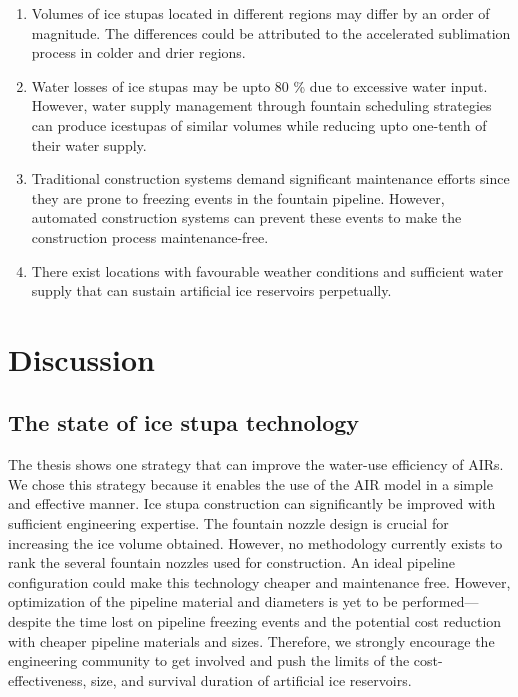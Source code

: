 \begin{enumerate} 

\item Volumes of ice stupas located in different regions may differ by an order of magnitude. The differences
  could be attributed to the accelerated sublimation process in colder and drier regions.

\item Water losses of ice stupas may be upto 80 \% due to excessive water input. However, water supply
  management through fountain scheduling strategies can produce icestupas of similar volumes while reducing upto
  one-tenth of their water supply.

\item Traditional construction systems demand significant maintenance efforts since they are prone to freezing
  events in the fountain pipeline. However, automated construction systems can prevent these events to make the
  construction process maintenance-free.

\item There exist locations with favourable weather conditions and sufficient water supply that can sustain
  artificial ice reservoirs perpetually.

\end{enumerate}

\section{Discussion}

\subsection{The state of ice stupa technology}

The thesis shows one strategy that can improve the water-use efficiency of AIRs. We chose this strategy
because it enables the use of the AIR model in a simple and effective manner. Ice stupa construction can
significantly be improved with sufficient engineering expertise. The fountain nozzle design is crucial for
increasing the ice volume obtained. However, no methodology currently exists to rank the several fountain
nozzles used for construction. An ideal pipeline configuration could make this technology cheaper and
maintenance free. However, optimization of the pipeline material and diameters is yet to be performed---despite
the time lost on pipeline freezing events and the potential cost reduction with cheaper pipeline materials and
sizes. Therefore, we strongly encourage the engineering community to get involved and push the limits of the
cost-effectiveness, size, and survival duration of artificial ice reservoirs. 

